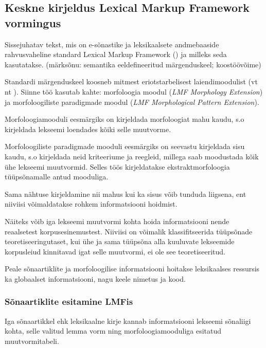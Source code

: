 \documentclass[12pt,a4paper]{article}
\begin{document}
\subsection{Keskne kirjeldus Lexical Markup Framework vormingus}

Sissejuhatav tekst, mis on e-sõnastike ja leksikaalsete andmebaaside rahvusvaheline standard Lexical Markup Framework (\cite{iso/tc_37/sc_4_language_2007}) ja milleks seda kasutatakse. (märksõnu: semantika eeldefineeritud märgenduskeel; koostöövõime)

Standardi märgenduskeel koosneb mitmest eriotstarbelisest laiendimoodulist (vt nt \cite{francopoulo_lmf_2013}). Siinne töö kasutab kahte: morfoloogia moodul (\textit{LMF Morphology Extension}) ja morfoloogiliste paradigmade moodul (\textit{LMF Morphological Pattern Extension}).

Morfoloogiamooduli eesmärgiks on kirjeldada morfoloogiat mahu kaudu, s.o kirjeldada lekseemi loendades kõiki selle muutvorme.

Morfoloogiliste paradigmade mooduli eesmärgiks on seevastu kirjeldada sisu kaudu, s.o kirjeldada neid kriteeriume ja reegleid, millega saab moodustada kõik ühe lekseemi muutvormid. Selles töös kirjeldatakse ekstraktmorfoloogia tüüpsõnamalle antud mooduliga.

Sama nähtuse kirjeldamine nii mahus kui ka sisus võib tunduda liigsena, ent niiviisi võimaldatakse rohkem informatsiooni hoidmist.

Näiteks võib iga lekseemi muutvormi kohta hoida informatsiooni nende reaalsetest korpusesinemustest. Niiviisi on võimalik klassifitseerida tüüpsõnade teoretiseeringutaset, kui ühe ja sama tüüpsõna alla kuuluvate lekseemide korpusleiud kinnitavad igat selle muutvormi, ei ole see teoretiseeritud.


Peale sõnaartiklite ja morfoloogilise informatsiooni hoitakse leksikaalses ressursis ka globaalset informatsiooni, nagu keele nimetus ja kood.




\subsubsection{Sõnaartiklite esitamine LMFis}
Iga sõnaartikkel ehk leksikaalne kirje kannab informatsiooni lekseemi sõnaliigi kohta, selle valitud lemma vorm ning morfoloogiamooduliga esitatud muutvormitabeli.
\end{document}
